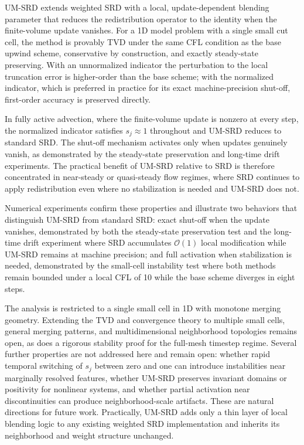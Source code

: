 \documentclass[11pt]{article}
\begin{document}
UM-SRD extends weighted SRD with a local, update-dependent blending 
parameter that reduces the redistribution operator to the identity when the 
finite-volume update vanishes. For a 1D model problem with a single small cut 
cell, the method is provably TVD under the same CFL condition as the base 
upwind scheme, conservative by construction, and exactly steady-state 
preserving. With an unnormalized indicator the perturbation to the local 
truncation error is higher-order than the base scheme; with the normalized 
indicator, which is preferred in practice for its exact machine-precision 
shut-off, first-order accuracy is preserved directly.

In fully active advection, where the finite-volume update is nonzero at 
every step, the normalized indicator satisfies $s_j \approx 1$ throughout 
and UM-SRD reduces to standard SRD. The shut-off mechanism activates only 
when updates genuinely vanish, as demonstrated by the steady-state 
preservation and long-time drift experiments. The practical benefit of 
UM-SRD relative to SRD is therefore concentrated in near-steady or 
quasi-steady flow regimes, where SRD continues to apply redistribution 
even where no stabilization is needed and UM-SRD does not.

Numerical experiments confirm these properties and illustrate two behaviors 
that distinguish UM-SRD from standard SRD: exact shut-off when the update 
vanishes, demonstrated by both the steady-state preservation test and the 
long-time drift experiment where SRD accumulates $\mathcal{O}(1)$ local 
modification while UM-SRD remains at machine precision; and full activation 
when stabilization is needed, demonstrated by the small-cell instability test 
where both methods remain bounded under a local CFL of 10 while the base 
scheme diverges in eight steps.

The analysis is restricted to a single small cell in 1D with monotone 
merging geometry. Extending the TVD and convergence theory to multiple small 
cells, general merging patterns, and multidimensional neighborhood 
topologies remains open, as does a rigorous stability proof for the 
full-mesh timestep regime. Several further properties are not addressed here 
and remain open: whether rapid temporal switching of $s_j$ between zero and 
one can introduce instabilities near marginally resolved features, whether 
UM-SRD preserves invariant domains or positivity for nonlinear systems, and 
whether partial activation near discontinuities can produce neighborhood-scale 
artifacts. These are natural directions for future work. Practically, UM-SRD 
adds only a thin layer of local blending logic to any existing weighted SRD 
implementation and inherits its neighborhood and weight structure unchanged.
\end{document}
